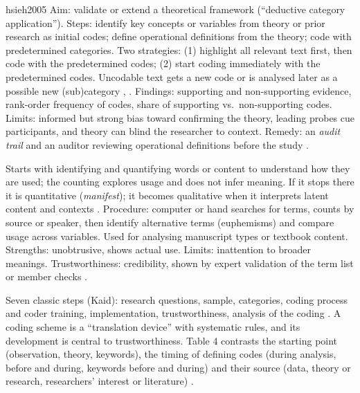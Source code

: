 \begin{papercard}{hsieh2005}
 Aim: validate or extend a theoretical framework (``deductive category application''). Steps: identify key concepts or variables from theory or prior research as initial codes; define operational definitions from the theory; code with predetermined categories. Two strategies: (1) highlight all relevant text first, then code with the predetermined codes; (2) start coding immediately with the predetermined codes. Uncodable text gets a new code or is analysed later as a possible new (sub)category , . Findings: supporting and non-supporting evidence, rank-order frequency of codes, share of supporting vs.\ non-supporting codes. Limits: informed but strong bias toward confirming the theory, leading probes cue participants, and theory can blind the researcher to context. Remedy: an \emph{audit trail} and an auditor reviewing operational definitions before the study .

 Starts with identifying and quantifying words or content to understand how they are used; the counting explores usage and does not infer meaning. If it stops there it is quantitative (\emph{manifest}); it becomes qualitative when it interprets latent content and contexts . Procedure: computer or hand searches for terms, counts by source or speaker, then identify alternative terms (euphemisms) and compare usage across variables. Used for analysing manuscript types or textbook content. Strengths: unobtrusive, shows actual use. Limits: inattention to broader meanings. Trustworthiness: credibility, shown by expert validation of the term list or member checks .

 Seven classic steps (Kaid): research questions, sample, categories, coding process and coder training, implementation, trustworthiness, analysis of the coding . A coding scheme is a ``translation device'' with systematic rules, and its development is central to trustworthiness. Table 4 contrasts the starting point (observation, theory, keywords), the timing of defining codes (during analysis, before and during, keywords before and during) and their source (data, theory or research, researchers' interest or literature) .


\end{papercard}
